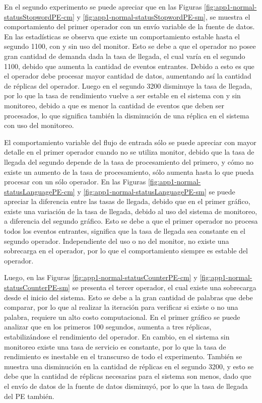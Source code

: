 En el segundo experimento se puede apreciar que en las Figuras \ref{fig:app1-normal-statusStopwordPE-cm} y \ref{fig:app1-normal-statusStopwordPE-sm}, se muestra el comportamiento del primer operador con un envío variable de la fuente de datos. En las estadísticas se observa que existe un comportamiento estable hasta el segundo 1100, con y sin uso del monitor. Esto se debe a que el operador no posee gran cantidad de demanda dada la tasa de llegada, el cual varía en el segundo 1100, debido que aumenta la cantidad de eventos entrantes. Debido a esto es que el operador debe procesar mayor cantidad de datos, aumentando así la cantidad de réplicas del operador. Luego en el segundo 3200 disminuye la tasa de llegada, por lo que la tasa de rendimiento vuelve a ser estable en el sistema con y sin monitoreo, debido a que es menor la cantidad de eventos que deben ser procesados, lo que significa también la disminución de una réplica en el sistema con uso del monitoreo.

El comportamiento variable del flujo de entrada sólo se puede apreciar con mayor detalle en el primer operador cuando no se utiliza monitor, debido que la tasa de llegada del segundo depende de la tasa de procesamiento del primero, y cómo no existe un aumento de la tasa de procesamiento, sólo aumenta hasta lo que pueda procesar con un sólo operador. En las Figuras \ref{fig:app1-normal-statusLanguagePE-cm} y \ref{fig:app1-normal-statusLanguagePE-sm} se puede apreciar la diferencia entre las tasas de llegada, debido que en el primer gráfico, existe una variación de la tasa de llegada, debido al uso del sistema de monitoreo, a diferencia del segundo gráfico. Esto se debe a que el primer operador no procesa todos los eventos entrantes, significa que la tasa de llegada sea constante en el segundo operador. Independiente del uso o no del monitor, no existe una sobrecarga en el operador, por lo que el comportamiento siempre es estable del operador.

Luego, en las Figuras \ref{fig:app1-normal-statusCounterPE-cm} y \ref{fig:app1-normal-statusCounterPE-sm} se presenta el tercer operador, el cual existe una sobrecarga desde el inicio del sistema. Esto se debe a la gran cantidad de palabras que debe comparar, por lo que al realizar la iteración para verificar si existe o no una palabra, requiere un alto costo computacional. En el primer gráfico se puede analizar que en los primeros 100 segundos, aumenta a tres réplicas, estabilizándose el rendimiento del operador. En cambio, en el sistema sin monitoreo existe una tasa de servicio es constante, por lo que la tasa de rendimiento es inestable en el transcurso de todo el experimento. También se muestra una disminución en la cantidad de réplicas en el segundo 3200, y esto se debe que la cantidad de réplicas necesarias para el sistema son menos, dado que el envío de datos de la fuente de datos disminuyó, por lo que la tasa de llegada del PE también.

